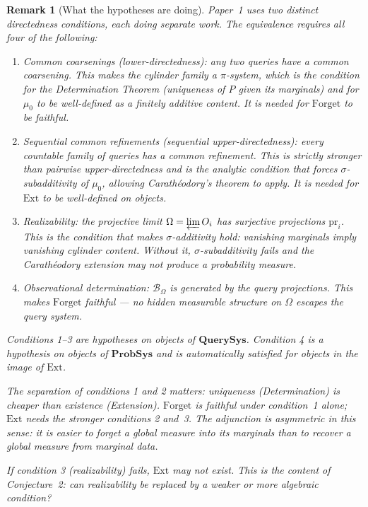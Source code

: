 \documentclass[11pt]{article}
\newtheorem{remark}{Remark}
\newcommand{\QSys}{\mathbf{QuerySys}}
\newcommand{\PSys}{\mathbf{ProbSys}}
\newcommand{\Bcal}{\mathcal{B}}
\newcommand{\pr}{\mathrm{pr}}
\newcommand{\Ext}{\mathrm{Ext}}
\newcommand{\Forget}{\mathrm{Forget}}
\newcommand{\varlim}{\varprojlim}
\begin{document}
\begin{remark}[What the hypotheses are doing]
Paper~1 uses two distinct directedness conditions, each doing separate work.
The equivalence requires all four of the following:
\begin{enumerate}
  \item \emph{Common coarsenings} (lower-directedness): any two queries
    have a common coarsening.  This makes the cylinder family a
    $\pi$-system, which is the condition for the Determination Theorem
    (uniqueness of $P$ given its marginals) and for $\mu_0$ to be
    well-defined as a finitely additive content.  It is needed for
    $\Forget$ to be faithful.
  \item \emph{Sequential common refinements} (sequential upper-directedness):
    every countable family of queries has a common refinement.  This is
    strictly stronger than pairwise upper-directedness and is the analytic
    condition that forces $\sigma$-subadditivity of $\mu_0$, allowing
    Carathéodory's theorem to apply.  It is needed for $\Ext$ to be
    well-defined on objects.
  \item \emph{Realizability}: the projective limit $\Omega = \varlim O_i$
    has surjective projections $\pr_i$.  This is the condition that makes
    $\sigma$-additivity hold: vanishing marginals imply vanishing cylinder
    content.  Without it, $\sigma$-subadditivity fails and the Carathéodory
    extension may not produce a probability measure.
  \item \emph{Observational determination}: $\Bcal_\Omega$ is generated by
    the query projections.  This makes $\Forget$ faithful --- no hidden
    measurable structure on $\Omega$ escapes the query system.
\end{enumerate}

Conditions 1--3 are hypotheses on objects of $\QSys$.  Condition 4 is a
hypothesis on objects of $\PSys$ and is automatically satisfied for objects
in the image of $\Ext$.

The separation of conditions 1 and 2 matters: uniqueness (Determination) is
\emph{cheaper} than existence (Extension).  $\Forget$ is faithful under
condition~1 alone; $\Ext$ needs the stronger conditions 2 and~3.  The
adjunction is asymmetric in this sense: it is easier to forget a global
measure into its marginals than to recover a global measure from marginal
data.

If condition 3 (realizability) fails, $\Ext$ may not exist.  This is the
content of Conjecture~2: can realizability be replaced by a weaker or more
algebraic condition?
\end{remark}
\end{document}
